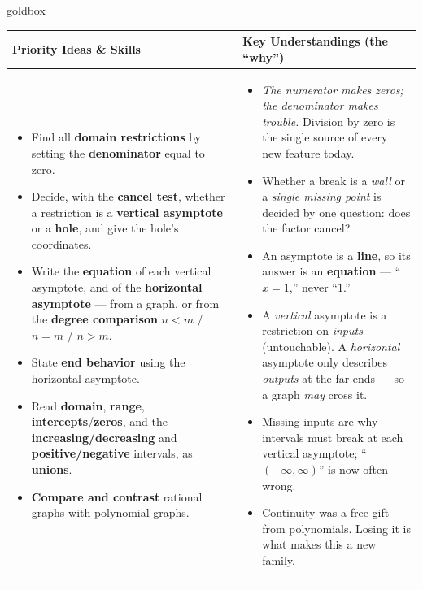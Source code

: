 \documentclass[10pt]{article}
\begin{document}
\renewcommand{\arraystretch}{1.4}
\begin{skillbox}{goldbox}
\begin{tabularx}{\linewidth}{@{}X|X@{}}
\textbf{Priority Ideas \& Skills} & \textbf{Key Understandings (the ``why'')} \\[2pt]
\hline
\vspace{-6pt}
\begin{itemize}[leftmargin=1.1em, nosep, after=\vspace{2pt}]
  \item Find all \textbf{domain restrictions} by setting the \textbf{denominator} equal to zero.
  \item Decide, with the \textbf{cancel test}, whether a restriction is a \textbf{vertical asymptote} or a \textbf{hole}, and give the hole's coordinates.
  \item Write the \textbf{equation} of each vertical asymptote, and of the \textbf{horizontal asymptote} --- from a graph, or from the \textbf{degree comparison} $n<m$ / $n=m$ / $n>m$.
  \item State \textbf{end behavior} using the horizontal asymptote.
  \item Read \textbf{domain}, \textbf{range}, \textbf{intercepts}/\textbf{zeros}, and the \textbf{increasing/decreasing} and \textbf{positive/negative} intervals, as \textbf{unions}.
  \item \textbf{Compare and contrast} rational graphs with polynomial graphs.
\end{itemize}
&
\vspace{-6pt}
\begin{itemize}[leftmargin=1.1em, nosep, after=\vspace{2pt}]
  \item \emph{The numerator makes zeros; the denominator makes trouble.} Division by zero is the single source of every new feature today.
  \item Whether a break is a \emph{wall} or a \emph{single missing point} is decided by one question: does the factor cancel?
  \item An asymptote is a \textbf{line}, so its answer is an \textbf{equation} --- ``$x=1$,'' never ``$1$.''
  \item A \emph{vertical} asymptote is a restriction on \emph{inputs} (untouchable). A \emph{horizontal} asymptote only describes \emph{outputs} at the far ends --- so a graph \emph{may} cross it.
  \item Missing inputs are why intervals must break at each vertical asymptote; ``$(-\infty,\infty)$'' is now often wrong.
  \item Continuity was a free gift from polynomials. Losing it is what makes this a new family.
\end{itemize}
\end{tabularx}
\end{skillbox}
\end{document}

